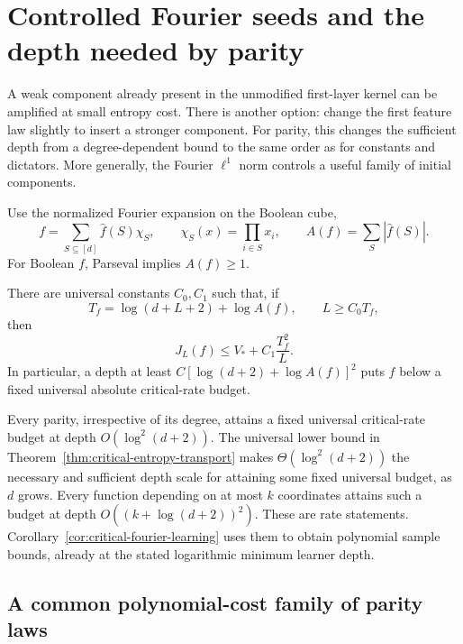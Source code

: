 \section{Controlled Fourier seeds and the depth needed by parity}
\label{sec:controlled-fourier-seeds}

A weak component already present in the unmodified first-layer kernel
can be amplified at small entropy cost. There is another option: change
the first feature law slightly to insert a stronger component. For parity,
this changes the sufficient depth from a degree-dependent bound to the
same order as for constants and dictators. More generally, the Fourier
$\ell^1$ norm controls a useful family of initial components.

Use the normalized Fourier expansion on the Boolean cube,
\[
 f=\sum_{S\subseteq[d]}\widehat f(S)\chi_S,\qquad
 \chi_S(x)=\prod_{i\in S}x_i,\qquad
 A(f)=\sum_S|\widehat f(S)|.
\]
For Boolean $f$, Parseval implies $A(f)\ge1$.

\begin{theorem}
\label{thm:controlled-fourier-seed}
There are universal constants $C_0,C_1$ such that, if
\[
 T_f=\log(d+L+2)+\log A(f),\qquad L\ge C_0T_f,
\]
then
\[
 J_L(f)\le V_*+C_1\frac{T_f^2}{L}.
\]
In particular, a depth at least
$C[\log(d+2)+\log A(f)]^2$ puts $f$ below a fixed universal absolute
critical-rate budget.
\end{theorem}

\begin{corollary}
\label{cor:controlled-parity-junta-depth}
Every parity, irrespective of its degree, attains a fixed universal
critical-rate budget at depth $O(\log^2(d+2))$.
The universal lower bound in Theorem~\ref{thm:critical-entropy-transport}
makes $\Theta(\log^2(d+2))$ the necessary and sufficient depth scale
for attaining some fixed universal budget, as $d$ grows.
Every function depending on at most $k$ coordinates attains such a
budget at depth $O((k+\log(d+2))^2)$.
These are rate statements. Corollary~\ref{cor:critical-fourier-learning}
uses them to obtain polynomial sample bounds, already at the stated
logarithmic minimum learner depth.
\end{corollary}

\subsection{A common polynomial-cost family of parity laws}

